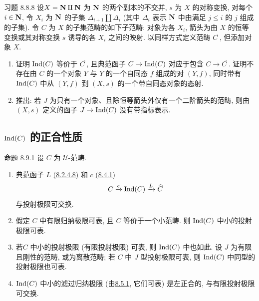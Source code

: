 \begin{enonce*}[remark]{习题 8.8.8}
设\pageoriginale $X=\mathbf{N}\amalg \mathbf{N}$ 为 $\mathbf{N}$ 的两个副本的不交并,
$s$ 为 $X$ 的对称变换, 对每个 $i\in \mathbf{N}$,
令 $X_i$ 为 $\mathbf{N}$ 的子集 $\Delta_{i+1}\amalg\Delta_i$
(其中 $\Delta_i$ 表示 $\mathbf{N}$ 中由满足 $j\leq
i$ 的 $j$ 组成的子集).
令 $C$ 为 $X$ 的子集范畴的如下子范畴: 对象为各 $X_i$,
箭头为由 $X$ 的恒等变换或其对称变换 $s$ 诱导的各 $X_i$ 之间的映射.
以同样方式定义范畴 $C^{\widetilde{\phantom{,}}}$, 但添加对象 $X$.

\begin{enumerate}
\renewcommand{\theenumi}{\alph{enumi}}
\renewcommand{\labelenumi}{\theenumi)}
\item 证明 $\operatorname{Ind}(C)$ 等价于 $C^{\widetilde{\phantom{,}}}$,
且典范函子 $C\rightarrow
\operatorname{Ind}(C)$ 对应于包含 $C\rightarrow
C^{\widetilde{\phantom{,}}}$.
证明不存在由 $C$ 的一个对象 $Y$ 与 $Y$ 的一个自同态 $f$ 组成的对 $(Y,f)$,
同时带有 $\operatorname{Ind}(C)$ 中从 $(Y,f)$ 到 $(X,s)$ 的一个带自同态对象的态射.

\item 推出: 若 $J$ 为只有一个对象、且除恒等箭头外仅有一个二阶箭头的范畴,
则由 $(X,s)$ 定义的函子 $J\rightarrow \operatorname{Ind}(C)$ 没有带指标表示.
\end{enumerate}
\end{enonce*}
 



\subsection{$\operatorname{Ind}(C)$ 的正合性质}

\begin{enonce*}{命题 8.9.1}
设 $C$ 为 $𝒰$-范畴.
\begin{enumerate}
\renewcommand{\theenumi}{\alph{enumi}}
\renewcommand{\labelenumi}{\theenumi)}
\item 典范函子 $L$ \hyperlink{sga4.exp.I.equation.8.2.4.8}{(8.2.4.8)} 和 $c$ \hyperlink{sga4.exp.I.equation.8.4.1}{(8.4.1)}
$$
C\xrightarrow{c}\operatorname{Ind}(C)\xrightarrow{L}\widehat{C}
$$
与投射极限可交换.

\item 假定 $C$ 中有限归纳极限可表, 且 $C$ 等价于一个小范畴.
则 $\operatorname{Ind}(C)$ 中小的投射极限可表.

\item 若\pageoriginale $C$ 中小的投射极限
(\resp 有限投射极限) 可表, 则 $\operatorname{Ind}(C)$ 中也如此.
设 $J$ 为有限且刚性的范畴, 或为离散范畴;
若 $C$ 中 $J$ 型投射极限可表, 则 $\operatorname{Ind}(C)$ 中同型的投射极限也可表.

\item $\operatorname{Ind}(C)$ 中小的滤过归纳极限 (由\hyperref[I.prop8.5.1]{8.5.1}, 它们可表)
是左正合的, \ie 与有限投射极限可交换.
\end{enumerate}
\end{enonce*}

